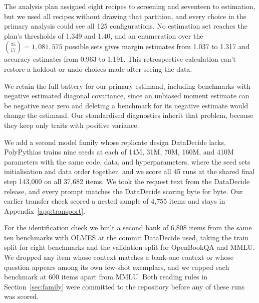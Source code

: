 The analysis plan assigned eight recipes to screening and seventeen to estimation, but we used all recipes without drawing that partition, and every choice in the primary analysis could see all 125 configurations. No estimation set reaches the plan's thresholds of 1.349 and 1.40, and an enumeration over the $\binom{25}{17}=1{,}081{,}575$ possible sets gives margin estimates from 1.037 to 1.317 and accuracy estimates from 0.963 to 1.191. This retrospective calculation can't restore a holdout or undo choices made after seeing the data.

We retain the full battery for our primary estimand, including benchmarks with negative estimated diagonal covariance, since an unbiased moment estimate can be negative near zero and deleting a benchmark for its negative estimate would change the estimand. Our standardised diagnostics inherit that problem, because they keep only traits with positive variance.

We add a second model family whose replicate design DataDecide lacks. PolyPythias \citep{vanderwal2025} trains nine seeds at each of 14M, 31M, 70M, 160M, and 410M parameters with the same code, data, and hyperparameters, where the seed sets initialisation and data order together, and we score all 45 runs at the shared final step 143,000 on all 37,682 items. We took the request text from the DataDecide release, and every prompt matches the DataDecide scoring byte for byte. Our earlier transfer check scored a nested sample of 4,755 items and stays in Appendix~\ref{app:transport}.

For the identification check we built a second bank of 6,808 items from the same ten benchmarks with OLMES at the commit DataDecide used, taking the train split for eight benchmarks and the validation split for OpenBookQA and MMLU. We dropped any item whose context matches a bank-one context or whose question appears among its own few-shot exemplars, and we capped each benchmark at 600 items apart from MMLU. Both reading rules in Section~\ref{sec:family} were committed to the repository before any of these runs was scored.

